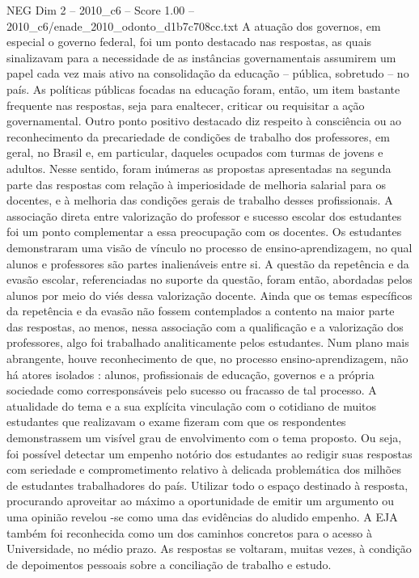 \begin{textsample}{NEG Dim 2 – 2010\_c6 – Score 1.00 – 2010\_c6/enade\_2010\_odonto\_d1b7c708cc.txt}
A atuação dos governos, em especial o governo federal, foi um ponto destacado nas respostas, as quais sinalizavam para a necessidade de as instâncias governamentais assumirem um papel cada vez mais ativo na consolidação da educação – pública, sobretudo – no país.
As políticas públicas focadas na educação foram, então, um item bastante frequente nas respostas, seja para enaltecer, criticar ou requisitar a ação governamental.
Outro ponto positivo destacado diz respeito à consciência ou ao reconhecimento da precariedade de condições de trabalho dos professores, em geral, no Brasil e, em particular, daqueles ocupados com turmas de jovens e adultos.
Nesse sentido, foram inúmeras as propostas apresentadas na segunda parte das respostas com relação à imperiosidade de melhoria salarial para os docentes, e à melhoria das condições gerais de trabalho desses profissionais.
A associação direta entre valorização do professor e sucesso escolar dos estudantes foi um ponto complementar a essa preocupação com os docentes.
Os estudantes demonstraram uma visão de vínculo no processo de ensino-aprendizagem, no qual alunos e professores são partes inalienáveis entre si.
A questão da repetência e da evasão escolar, referenciadas no suporte da questão, foram então, abordadas pelos alunos por meio do viés dessa valorização docente.
Ainda que os temas específicos da repetência e da evasão não fossem contemplados a contento na maior parte das respostas, ao menos, nessa associação com a qualificação e a valorização dos professores, algo foi trabalhado analiticamente pelos estudantes.
Num plano mais abrangente, houve reconhecimento de que, no processo ensino-aprendizagem, não há atores isolados : alunos, profissionais de educação, governos e a própria sociedade como corresponsáveis pelo sucesso ou fracasso de tal processo.
A atualidade do tema e a sua explícita vinculação com o cotidiano de muitos estudantes que realizavam o exame fizeram com que os respondentes demonstrassem um visível grau de envolvimento com o tema proposto.
Ou seja, foi possível detectar um empenho notório dos estudantes ao redigir suas respostas com seriedade e comprometimento relativo à delicada problemática dos milhões de estudantes trabalhadores do país.
Utilizar todo o espaço destinado à resposta, procurando aproveitar ao máximo a oportunidade de emitir um argumento ou uma opinião revelou -se como uma das evidências do aludido empenho.
A EJA também foi reconhecida como um dos caminhos concretos para o acesso à Universidade, no médio prazo.
As respostas se voltaram, muitas vezes, à condição de depoimentos pessoais sobre a conciliação de trabalho e estudo.

\end{textsample}
